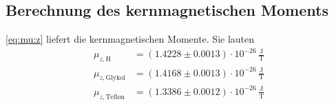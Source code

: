 \subsection{Berechnung des kernmagnetischen Moments}
\autoref{eq:mu:z} liefert die kernmagnetischen Momente. Sie lauten
\begin{equation}
\begin{split}
\mu_{z,\text{H}}&= (1.4228	\pm 0.0013) \cdot 10^{-26}\,\frac{\text{J}}{\text{T}}\\
\mu_{z,\text{Glykol}}&= (1.4168	\pm 0.0013) \cdot 10^{-26}\,\frac{\text{J}}{\text{T}}\\
\mu_{z,\text{Teflon}}&= (1.3386	\pm 0.0012) \cdot 10^{-26}\,\frac{\text{J}}{\text{T}}
\end{split}
\end{equation}


